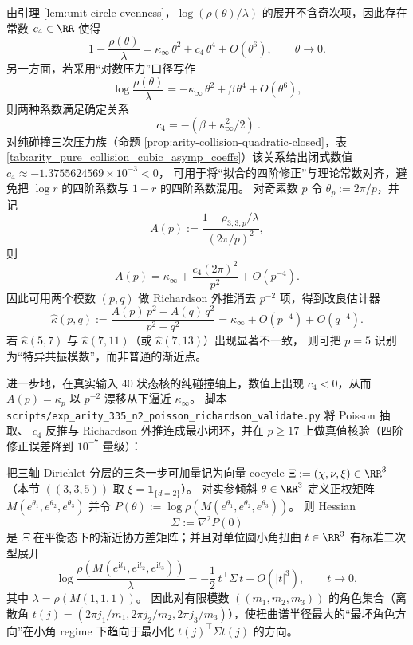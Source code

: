 \begin{remark}\label{rem:arity-335-richardson-kappa}
由引理 \ref{lem:unit-circle-evenness}，$\log(\rho(\theta)/\lambda)$ 的展开不含奇次项，因此存在常数 $c_4\in\RR$ 使得
\[
1-\frac{\rho(\theta)}{\lambda}
=\kappa_\infty\,\theta^2+c_4\,\theta^4+O(\theta^6),
\qquad \theta\to 0.
\]
另一方面，若采用“对数压力”口径写作
\[
\log\frac{\rho(\theta)}{\lambda}
=-\kappa_\infty\,\theta^2+\beta\,\theta^4+O(\theta^6),
\]
则两种系数满足确定关系
\[
\boxed{\ c_4=-(\beta+\kappa_\infty^2/2)\ }.
\]
对纯碰撞三次压力族（命题 \ref{prop:arity-collision-quadratic-closed}，表 \ref{tab:arity_pure_collision_cubic_asymp_coeffs}）该关系给出闭式数值
\(
c_4\approx -1.3755624569\times 10^{-3}<0
\)，
可用于将“拟合的四阶修正”与理论常数对齐，避免把 \(\log r\) 的四阶系数与 \(1-r\) 的四阶系数混用。
对奇素数 $p$ 令 $\theta_p:=2\pi/p$，并记
\[
A(p):=\frac{1-\rho_{3,3,p}/\lambda}{(2\pi/p)^2},
\]
则
\[
A(p)=\kappa_\infty+\frac{c_4(2\pi)^2}{p^2}+O(p^{-4}).
\]
因此可用两个模数 $(p,q)$ 做 Richardson 外推消去 $p^{-2}$ 项，得到改良估计器
\[
\widehat\kappa(p,q)
:=\frac{A(p)\,p^2-A(q)\,q^2}{p^2-q^2}
=\kappa_\infty+O(p^{-4})+O(q^{-4}).
\]
若 $\widehat\kappa(5,7)$ 与 $\widehat\kappa(7,11)$（或 $\widehat\kappa(7,13)$）出现显著不一致，
则可把 $p=5$ 识别为“特异共振模数”，而非普通的渐近点。
\par
进一步地，在真实输入 $40$ 状态核的纯碰撞轴上，数值上出现 \(c_4<0\)，从而
\(A(p)=\kappa_p\) 以 \(p^{-2}\) 漂移从下逼近 \(\kappa_\infty\)。
脚本 \texttt{scripts/exp\_arity\_335\_n2\_poisson\_richardson\_validate.py} 将 Poisson 抽取、
\(c_4\) 反推与 Richardson 外推连成最小闭环，并在 \(p\ge 17\) 上做真值核验（四阶修正误差降到 \(10^{-7}\) 量级）：

\end{remark}

\begin{remark}\label{prop:arity-335-worst-direction-cov}
把三轴 Dirichlet 分层的三条一步可加量记为向量 cocycle
\(
\Xi:=(\chi,\nu,\xi)\in\RR^3
\)
（本节 \(((3,3,5))\) 取 \(\xi=\mathbf{1}_{\{d=2\}}\)）。
对实参倾斜 \(\theta\in\RR^3\) 定义正权矩阵 \(M(e^{\theta_1},e^{\theta_2},e^{\theta_3})\) 并令
\(
P(\theta):=\log\rho(M(e^{\theta_1},e^{\theta_2},e^{\theta_3}))
\)。
则 Hessian
\[
\Sigma:=\nabla^2 P(0)
\]
是 \(\Xi\) 在平衡态下的渐近协方差矩阵；并且对单位圆小角扭曲 \(t\in\RR^3\) 有标准二次型展开
\[
\log\frac{\rho(M(e^{\mathrm{i}t_1},e^{\mathrm{i}t_2},e^{\mathrm{i}t_3}))}{\lambda}
=
-\frac12\,t^\top\Sigma\,t
+O(|t|^3),
\qquad t\to 0,
\]
其中 \(\lambda=\rho(M(1,1,1))\)。
因此对有限模数 \(((m_1,m_2,m_3))\) 的角色集合（离散角 \(t(j)=(2\pi j_1/m_1,2\pi j_2/m_2,2\pi j_3/m_3)\)），使扭曲谱半径最大的“最坏角色方向”在小角 regime 下趋向于最小化 \(t(j)^\top\Sigma t(j)\) 的方向。
\end{remark}

